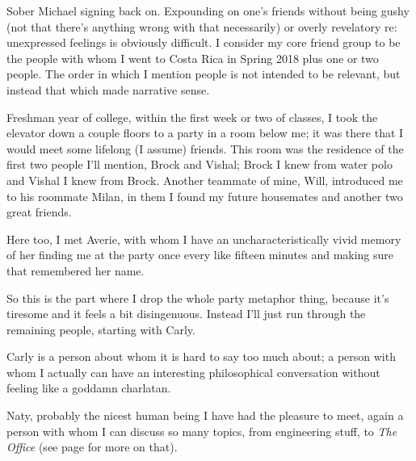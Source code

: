 \documentclass[./butidigress.tex]{subfiles}
\begin{document}
Sober Michael signing back on.
Expounding on one's friends without being gushy (not that there's anything wrong with that necessarily) or overly revelatory re: unexpressed feelings is obviously difficult.
I consider my core friend group to be the people with whom I went to Costa Rica in Spring 2018 plus one or two people.
The order in which I mention people is not intended to be relevant, but instead that which made narrative sense.

Freshman year of college, within the first week or two of classes, I took the elevator down a couple floors to a party in a room below me; it was there that I would meet some lifelong (I assume) friends.
This room was the residence of the first two people I'll mention, Brock and Vishal; Brock I knew from water polo and Vishal I knew from Brock.%
Another teammate of mine, Will, introduced me to his roommate Milan, in them I found my future housemates and another two great friends.

\vspace{1em}

Here too, I met Averie, with whom I have an uncharacteristically vivid memory of her finding me at the party once every like fifteen minutes and making sure that remembered her name.

So this is the part where I drop the whole party metaphor thing, because it's tiresome and it feels a bit disingenuous.
Instead I'll just run through the remaining people, starting with Carly.

Carly is a person about whom it is hard to say too much about; a person with whom I actually can have an interesting philosophical conversation without feeling like a goddamn charlatan.

Naty, probably the nicest human being I have had the pleasure to meet, again a person with whom I can discuss so many topics, from engineering stuff, to \textit{The Office} (see page \pageref{chap:sincerity} for more on that).
\end{document}
